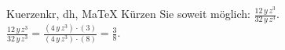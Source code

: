 \begin{MAufgabe}{Kuerzen}{kr, dh, MaTeX}
K\"urzen Sie soweit m\"oglich: $\frac{12\, y\, z^3}{32\, y\, z^3}$.\\ 
\ifLsg\MLoesung
\quad $\frac{12\, y\, z^3}{32\, y\, z^3}=\frac{(4\, y\, z^3)\cdot(3)}{(4\, y\, z^3)\cdot(8)}=\frac{3}{8}$.\else\relax\fi
 \end{MAufgabe}
